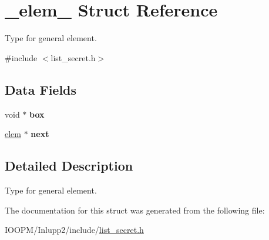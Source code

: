 \hypertarget{struct__elem__}{}\section{\+\_\+elem\+\_\+ Struct Reference}
\label{struct__elem__}


Type for general element.  




{\ttfamily \#include $<$list\+\_\+secret.\+h$>$}

\subsection*{Data Fields}
\begin{DoxyCompactItemize}
\item 
\hypertarget{struct__elem___af06c82a131c92d169d94c8602c64f757}{}void $\ast$ {\bfseries box}\label{struct__elem___af06c82a131c92d169d94c8602c64f757}

\item 
\hypertarget{struct__elem___a3f6417aeec27282903f7e8a406173713}{}\hyperlink{struct__elem__}{elem} $\ast$ {\bfseries next}\label{struct__elem___a3f6417aeec27282903f7e8a406173713}

\end{DoxyCompactItemize}


\subsection{Detailed Description}
Type for general element. 

The documentation for this struct was generated from the following file\+:\begin{DoxyCompactItemize}
\item 
I\+O\+O\+P\+M/\+Inlupp2/include/\hyperlink{list__secret_8h}{list\+\_\+secret.\+h}\end{DoxyCompactItemize}
